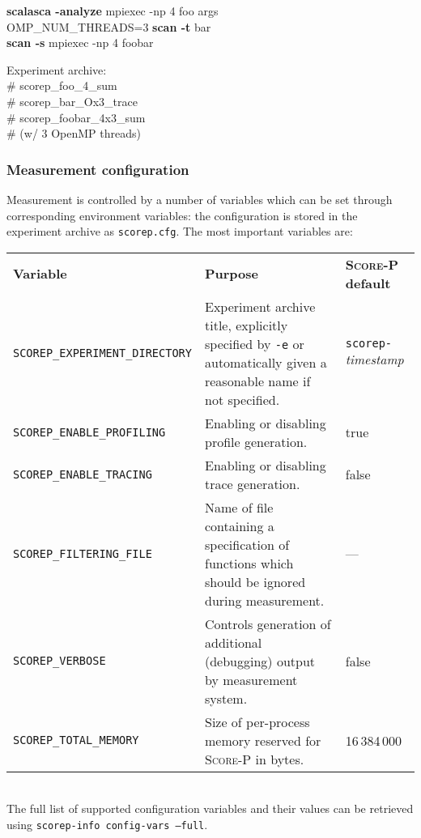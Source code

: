 \documentclass[a4paper]{article}
\newcommand{\Scorep}{\textsc{Score-P}\xspace}
\begin{document}
\begin{itemize}
\begin{minipage}[t]{0.5\linewidth}
      \textbf{scalasca -analyze} mpiexec -np 4 foo args \\
      OMP\_NUM\_THREADS=3 \textbf{scan -t} bar \\
      \textbf{scan -s} mpiexec -np 4 foobar
    \end{minipage}
    \begin{minipage}[t]{0.325\linewidth}
      Experiment archive: \\\ttfamily
      \# scorep\_foo\_4\_sum \\
      \# scorep\_bar\_Ox3\_trace \\
      \# scorep\_foobar\_4x3\_sum \\
      \# (w/ 3 OpenMP threads)
    \end{minipage}
\end{itemize}


\subsubsection*{Measurement configuration}

Measurement is controlled by a number of variables which can be set through
corresponding environment variables: the configuration is stored in the
experiment archive as \texttt{scorep.cfg}. The most important variables are:
\\[1ex]
\begin{tabularx}{\linewidth}{lX@{\hspace*{10mm}}l}
  \textbf{Variable} & \textbf{Purpose} & \textbf{\Scorep default} \\

  \texttt{SCOREP\_EXPERIMENT\_DIRECTORY} &
    Experiment archive title, explicitly specified by \texttt{-e} or
    automatically given a reasonable name if not specified.
    &
    \texttt{scorep-}\textit{timestamp} \\

   \texttt{SCOREP\_ENABLE\_PROFILING} &
    Enabling or disabling profile generation.
    &
    true \\

   \texttt{SCOREP\_ENABLE\_TRACING} &
    Enabling or disabling trace generation.
    &
    false \\
    
 \texttt{SCOREP\_FILTERING\_FILE} &
    Name of file containing a specification of functions which should be
    ignored during measurement.
    &
    --- \\

   \texttt{SCOREP\_VERBOSE} &
    Controls generation of additional (debugging) output by measurement
    system. &
    false \\

  \texttt{SCOREP\_TOTAL\_MEMORY} &
    Size of per-process memory reserved for \Scorep in bytes. &
    16\,384\,000 \\
\end{tabularx}
\\[1ex]
The full list of supported configuration variables and their values can be retrieved using
\texttt{scorep-info config-vars --full}.
 
\end{document}
